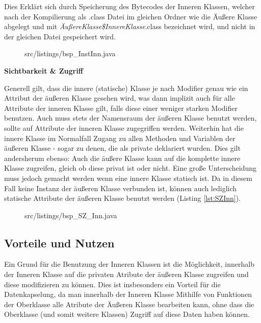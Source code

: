 Dies Erklärt sich durch Speicherung des Bytecodes der Inneren Klassen, welcher nach der Kompilierung als .class Datei im gleichen Ordner wie die Äußere Klasse abgelegt und mit {\it ÄußereKlasse\$InnereKlasse}.class bezeichnet wird, und nicht in der gleichen Datei gespeichert wird.

\begin{figure}[hbt]
\lstset{language=Java}
 {src/listings/bsp_InstInn.java}
\end{figure}


{\bf Sichtbarkeit \& Zugriff}

Generell gilt, dass die innere (statische) Klasse je nach Modifier genau wie ein Attribut der äußeren Klasse gesehen wird, was dann implizit auch für alle Attribute der inneren Klasse gilt, falls diese einer weniger starken Modifier benutzen.
Auch muss stets der Namensraum der äußeren Klasse benutzt werden, sollte auf Attribute der inneren Klasse zugegriffen werden.
Weiterhin hat die innere Klasse im Normalfall Zugang zu allen Methoden und Variablen der äußeren Klasse - sogar zu denen, die als private deklariert wurden.
Dies gilt andersherum ebenso: Auch die äußere Klasse kann auf die komplette innere Klasse zugreifen, gleich ob diese privat ist oder nicht.
Eine große Unterscheidung muss jedoch gemacht werden wenn eine innere Klasse statisch ist. Da in diesem Fall keine Instanz der äußeren Klasse verbunden ist, können auch lediglich statische Attribute der äußeren Klasse benutzt werden (Listing \ref{lst:SZInn}).

\begin{figure}[hbt]
\lstset{language=Java}
 {src/listings/bsp_SZ_Inn.java}
\end{figure}


\subsection{Vorteile und Nutzen}

Ein Grund für die Benutzung der Inneren Klassen ist die Möglichkeit, innerhalb der Inneren Klasse auf die privaten Atribute der äußeren Klasse zugreifen und diese modifizieren zu können.
Dies ist insbesonders ein Vorteil für die Datenkapselung, da man innerhalb der Inneren Klasse Mithilfe von Funktionen der Oberklasse alle Atribute der Äußeren Klasse bearbeiten kann, ohne dass die Oberklasse (und somit weitere Klassen) Zugriff auf diese Daten haben können.

